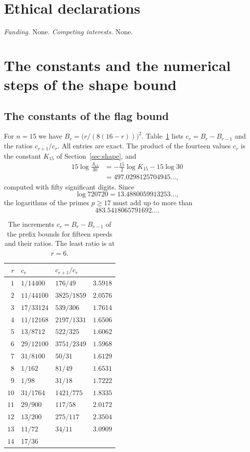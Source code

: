 \documentclass[aps,prd,twocolumn,superscriptaddress,nofootinbib,longbibliography,floatfix,showkeys,amsmath,amssymb,10pt]{revtex4-2}
\theoremstyle{definition}
\theoremstyle{remark}
\begin{document}
\section*{Ethical declarations}

\emph{Funding.} None. \emph{Competing interests.} None.


\appendix

\section{The constants and the numerical steps of the shape bound}\label{app:shape}

\subsection{The constants of the flag bound}

For $n=15$ we have $B_r=\bigl(r/(8(16-r))\bigr)^2$. Table~\ref{tab:cr} lists
$c_r=B_r-B_{r-1}$ and the ratios $c_{r+1}/c_r$. All entries are exact. The
product of the fourteen values $c_r$ is the constant $K_{15}$ of
Section~\ref{sec:shape}, and
\begin{align*}
 15\log\frac{A_{15}}{30}&=-\frac{15}2\log K_{15}-15\log30\\
 &=497.0298125704945\ldots ,
\end{align*}
computed with fifty significant digits. Since
\[
 \log720720=13.4880059913253\ldots ,
\]
the logarithms of the primes $p\ge17$ must add up to more than
\[
 483.5418065791692\ldots .
\]

\begin{table}[t]
\caption{The increments $c_r=B_r-B_{r-1}$ of the prefix bounds for fifteen
speeds and their ratios. The least ratio is at $r=6$.}
\label{tab:cr}
\centering
\small
\begin{tabular}{@{}rlll@{}}
\toprule
$r$ & $c_r$ & $c_{r+1}/c_r$ & \\
\midrule
$1$ & $1/14400$ & $176/49$ & $3.5918$\\
$2$ & $11/44100$ & $3825/1859$ & $2.0576$\\
$3$ & $17/33124$ & $539/306$ & $1.7614$\\
$4$ & $11/12168$ & $2197/1331$ & $1.6506$\\
$5$ & $13/8712$ & $522/325$ & $1.6062$\\
$6$ & $29/12100$ & $3751/2349$ & $1.5968$\\
$7$ & $31/8100$ & $50/31$ & $1.6129$\\
$8$ & $1/162$ & $81/49$ & $1.6531$\\
$9$ & $1/98$ & $31/18$ & $1.7222$\\
$10$ & $31/1764$ & $1421/775$ & $1.8335$\\
$11$ & $29/900$ & $117/58$ & $2.0172$\\
$12$ & $13/200$ & $275/117$ & $2.3504$\\
$13$ & $11/72$ & $34/11$ & $3.0909$\\
$14$ & $17/36$ &  & \\
\bottomrule
\end{tabular}
\end{table}
\end{document}
